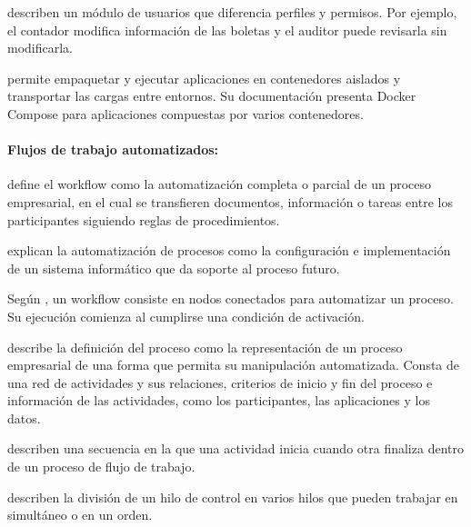     \textcite[pp.~4--5, sección \enquote{Users accounts module}]{ahmed2023web} describen un módulo de usuarios que diferencia perfiles y permisos. Por ejemplo, el contador modifica información de las boletas y el auditor puede revisarla sin modificarla.

     \textcite[secciones \enquote{The Docker platform} y \enquote{Responsive deployment and scaling}]{dockerOverview} permite empaquetar y ejecutar aplicaciones en contenedores aislados y transportar las cargas entre entornos. Su documentación presenta Docker Compose para aplicaciones compuestas por varios contenedores.

\paragraph{Flujos de trabajo automatizados:}

\textcite[8]{wfmc1999glosario} define el workflow como la automatización completa o parcial de un proceso empresarial, 
en el cual se transfieren documentos, información o tareas entre los participantes siguiendo reglas de procedimientos.

\textcite[20]{dumas2013fundamentals} explican la automatización de procesos como la configuración e 
implementación de un sistema informático que da soporte al proceso futuro.

Según \textcite[sección \enquote{Understand workflows}, definición inicial y nota al pie]{n8n}, 
un workflow consiste en nodos conectados para automatizar un proceso. Su ejecución comienza al cumplirse una condición de activación.

 \textcite[11]{wfmc1999glosario} describe la definición del proceso como la representación de un 
proceso empresarial de una forma que permita su manipulación automatizada. Consta de una red de actividades y sus relaciones, 
criterios de inicio y fin del proceso e información de las actividades, como los participantes, las aplicaciones y los datos.

 \textcite[10]{dumas2013fundamentals} describen una secuencia en la que una actividad inicia 
cuando otra finaliza dentro de un proceso de flujo de trabajo.

 \textcite[10]{vanderaalst2003workflow} describen la división de un hilo de control 
en varios hilos que pueden trabajar en simultáneo o en un orden.

